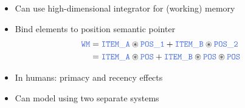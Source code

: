 \documentclass[10pt,letterpaper]{article}
\begin{document}
\begin{itemize}
	\item Can use high-dimensional integrator for (working) memory
	\item Bind elements to position semantic pointer
	\begin{align*}
		\Obj{WM} &= \Obj{ITEM\_A} \CC \Obj{POS\_1} + \Obj{ITEM\_B} \CC \Obj{POS\_2} \\
		         &= \Obj{ITEM\_A} \CC \Obj{POS} + \Obj{ITEM\_B} \CC \Obj{POS} \CC \Obj{POS}
	\end{align*}
	\item In humans: primacy and recency effects
	\item Can model using two separate systems
\end{itemize}
\end{document}

